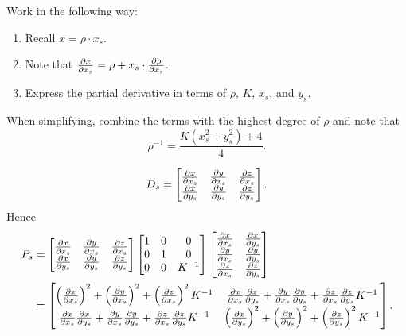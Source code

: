 \documentclass[newpage,hints,handout,12pt,noauthor,nooutcomes]{ximera}
\begin{document}
\begin{problem}
  \begin{hint}
  Work in the following way:
  \begin{enumerate}
  \item Recall $x = \rho\cdot x_s$.
  \item Note that $\pp[x]{x_s} = \rho + x_s \cdot \pp[\rho]{x_s}$.
  \item Express the partial derivative in terms of $\rho$, $K$, $x_s$,
      and $y_s$.
  \end{enumerate}
  \end{hint}


  \begin{hint}
  When simplifying, combine the terms with the highest degree of $\rho$
  and note that
  \[
  \rho^{-1} = \frac{K\left(x_s^2 + y_s^2\right)+4}{4}.
  \]
\end{hint}


\begin{freeResponse}
  \[
  D_s =
  \begin{bmatrix}
    \pp[x]{x_s} & \pp[y]{x_s} & \pp[z]{x_s} \\
    \pp[x]{y_s}   & \pp[y]{y_s}   & \pp[z]{y_s}
  \end{bmatrix}.
  \]
  Hence
    \begin{align*}
      P_s &=
      \begin{bmatrix}
        \pp[x]{x_s} & \pp[y]{x_s} & \pp[z]{x_s} \\
        \pp[x]{y_s} & \pp[y]{y_s} & \pp[z]{y_s}
      \end{bmatrix}
      \begin{bmatrix}
        1 & 0 & 0\\
        0 & 1 & 0\\
        0 & 0 & K^{-1}
      \end{bmatrix}
      \begin{bmatrix}
        \pp[x]{x_s} & \pp[x]{y_s}\\ 
        \pp[y]{x_s} & \pp[y]{y_s}\\
        \pp[z]{x_s} & \pp[z]{y_s}
      \end{bmatrix}\\
      &=
      \begin{bmatrix}
        \left(\pp[x]{x_s}\right)^2 + \left(\pp[y]{x_s}\right)^2 + \left(\pp[z]{x_s}\right)^2K^{-1} & \pp[x]{x_s}\pp[x]{y_s} + \pp[y]{x_s}\pp[y]{y_s} + \pp[z]{x_s}\pp[z]{y_s} K^{-1}\\
        \pp[x]{x_s}\pp[x]{y_s} + \pp[y]{x_s}\pp[y]{y_s} + \pp[z]{x_s}\pp[z]{y_s} K^{-1}       & \left(\pp[x]{y_s}\right)^2 + \left(\pp[y]{y_s}\right)^2 + \left(\pp[z]{y_s}\right)^2K^{-1}
      \end{bmatrix}.
    \end{align*}



\end{freeResponse}
\end{problem}
\end{document}

